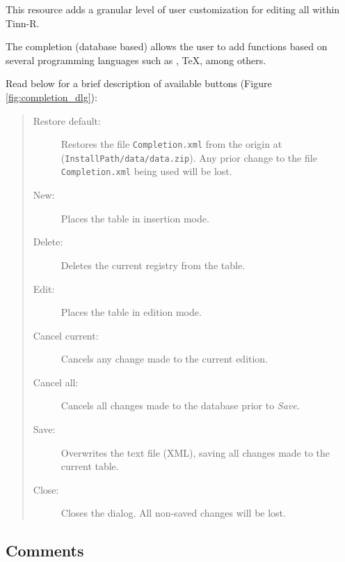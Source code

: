 This resource adds a granular level of user customization for editing
all within Tinn-R.

The completion (database based) allows the user to add functions based
on several programming languages such as \RR{}, \TeX, among others.

Read below for a brief description of available buttons (Figure \ref{fig:completion_dlg}):

\begin{quote}
  \begin{footnotesize}
    \begin{description}
      \item[Restore default:]
        Restores the file \texttt{Completion.xml} from the origin at
        (\texttt{InstallPath/data/data.zip}). Any prior change to the file
        \texttt{Completion.xml} being used will be lost.
      \item[New:]
        Places the table in insertion mode.
      \item[Delete:]
        Deletes the current registry from the table.
      \item[Edit:]
        Places the table in edition mode.
      \item[Cancel current:]
        Cancels any change made to the current edition.
      \item[Cancel all:]
        Cancels all changes made to the database prior to \textit{Save}.
      \item[Save:]
        Overwrites the text file (XML), saving all changes made to the current table.
      \item[Close:]
        Closes the dialog. All non-saved changes will be lost.
    \end{description}
  \end{footnotesize}
\end{quote}


\subsection{Comments}

